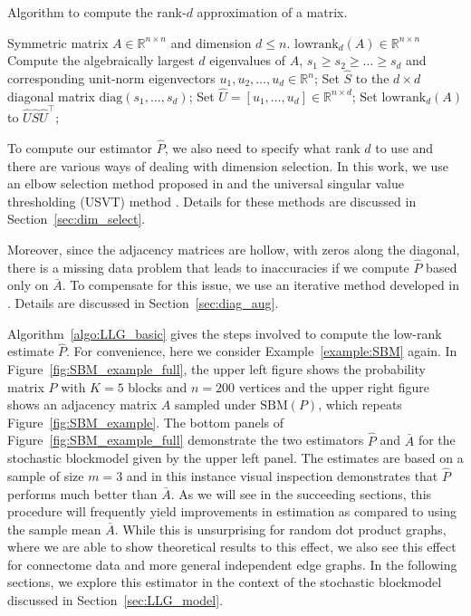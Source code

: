 \begin{algorithm}[H]
\caption{Algorithm to compute the rank-$d$ approximation of a matrix.}
\label{algo:LLG_lowrank}
\begin{algorithmic}[1]
\REQUIRE Symmetric matrix $A\in \mathbb{R}^{n \times n}$ and dimension $d \leq n$.
\ENSURE $\mathrm{lowrank}_d(A)\in \mathbb{R}^{n \times n}$
\STATE Compute the algebraically largest $d$ eigenvalues of $A$, $s_1\geq s_2\geq \dotsc\geq s_d$ and corresponding unit-norm eigenvectors $u_1,u_2,\dotsc,u_d\in \mathbb{R}^n$;
\STATE Set $\hat{S}$ to the $d\times d$ diagonal matrix $\mathrm{diag}(s_1,\dotsc,s_d)$;
\STATE Set $\hat{U} = [u_1,\dotsc,u_d]\in \mathbb{R}^{n \times d}$;
\STATE Set $\mathrm{lowrank}_d(A)$ to $\hat{U}\hat{S}\hat{U}^{\top}$;
\end{algorithmic}
\end{algorithm}

To compute our estimator $\hat{P}$, we also need to specify what rank $d$ to use and there are various ways of dealing with dimension selection. 
In this work, we use an elbow selection method proposed in \citet{zhu2006automatic} and the universal singular value thresholding (USVT) method \citep{chatterjee2015matrix}. 
Details for these methods are discussed in Section~\ref{sec:dim_select}.

Moreover, since the adjacency matrices are hollow, with zeros along the diagonal, there is a missing data problem that leads to inaccuracies if we compute $\hat{P}$ based only on $\bar{A}$. 
To compensate for this issue, we use an iterative method developed in \citet{scheinerman2010modeling}. 
Details are discussed in Section~\ref{sec:diag_aug}.

Algorithm~\ref{algo:LLG_basic} gives the steps involved to compute the low-rank estimate $\hat{P}$. For convenience, here we consider Example~\ref{example:SBM} again.
In Figure~\ref{fig:SBM_example_full}, the upper left figure shows the probability matrix $P$ with $K = 5$ blocks and $n=200$ vertices and the upper right figure shows an adjacency matrix $A$ sampled under $\mathrm{SBM}(P)$, which repeats Figure~\ref{fig:SBM_example}.
The bottom panels of Figure~\ref{fig:SBM_example_full} demonstrate the two estimators $\hat{P}$ and $\bar{A}$ for the stochastic blockmodel given by the upper left panel. 
The estimates are based on a sample of size $m=3$ and in this instance visual inspection demonstrates that $\hat{P}$ performs much better than $\bar{A}$.
As we will see in the succeeding sections, this procedure will frequently yield improvements in estimation as compared to using the sample mean $\bar{A}$.
While this is unsurprising for random dot product graphs, where we are able to show theoretical results to this effect, we also see this effect for connectome data and more general independent edge graphs.
In the following sections, we explore this estimator in the context of the stochastic blockmodel discussed in Section~\ref{sec:LLG_model}.

